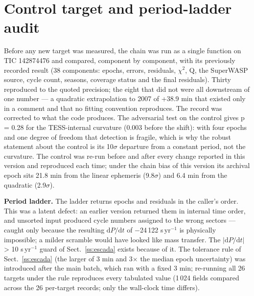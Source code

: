 \documentclass{aa}
\begin{document}
\begin{sloppypar}
\end{sloppypar}

\appendix

\section{Control target and period-ladder audit}\label{a:A}
Before any new target was measured, the chain was run as a single function on TIC 142874476 and compared, component by component, with its previously recorded result (38 components: epochs, errors, residuals, $\chi^2$, Q, the SuperWASP source, cycle count, seasons, coverage status and the final residuals). Thirty reproduced to the quoted precision; the eight that did not were all downstream of one number --- a quadratic extrapolation to 2007 of +38.9 min that existed only in a comment and that no fitting convention reproduces. The record was corrected to what the code produces. The adversarial test on the control gives p = 0.28 for the TESS-internal curvature (0.003 before the shift): with four epochs and one degree of freedom that detection is fragile, which is why the robust statement about the control is its 10$\sigma$ departure from a constant period, not the curvature. The control was re-run before and after every change reported in this version and reproduced each time; under the chain bias of this version its archival epoch sits 21.8 min from the linear ephemeris (9.8$\sigma$) and 6.4 min from the quadratic (2.9$\sigma$).

\textbf{Period ladder.} The ladder returns epochs and residuals in the caller's order. This was a latent defect: an earlier version returned them in internal time order, and unsorted input produced cycle numbers assigned to the wrong sectors --- caught only because the resulting $\mathrm{d}P/\mathrm{d}t$ of $-$24\,122 s\,yr$^{-1}$ is physically impossible; a milder scramble would have looked like mass transfer. The $|\mathrm{d}P/\mathrm{d}t|$ > 10 s\,yr$^{-1}$ guard of Sect.~\ref{ss:escada} exists because of it. The tolerance rule of Sect.~\ref{ss:escada} (the larger of 3 min and 3$\times$ the median epoch uncertainty) was introduced after the main batch, which ran with a fixed 3 min; re-running all 26 targets under the rule reproduces every tabulated value (1\,024 fields compared across the 26 per-target records; only the wall-clock time differs).
\end{document}
